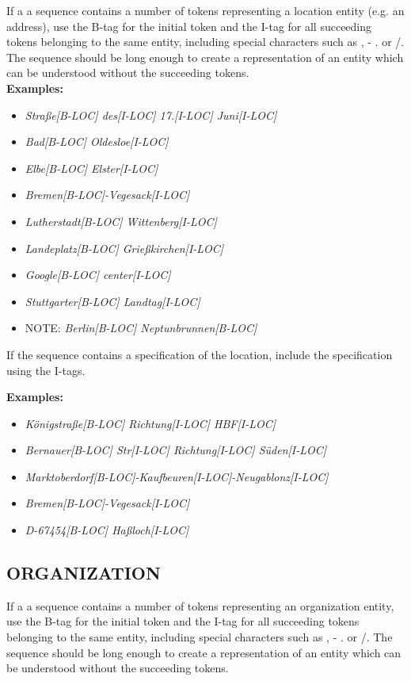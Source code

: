 If a a sequence contains a number of tokens representing a location entity (e.g. an address), use the B-tag for the initial token and the I-tag for all succeeding tokens belonging to the same entity, including special characters such as , - . or /. The sequence should be long enough to create a representation of an entity which can be understood without the succeeding tokens.\\
 
\noindent\textbf{Examples:}
\begin{itemize}
	\item \textit{Straße[B-LOC] des[I-LOC] 17.[I-LOC] Juni[I-LOC]}
	\item \textit{Bad[B-LOC] Oldesloe[I-LOC]}
	\item \textit{Elbe[B-LOC] Elster[I-LOC]}
	\item \textit{Bremen[B-LOC]-Vegesack[I-LOC]}
	\item \textit{Lutherstadt[B-LOC] Wittenberg[I-LOC]}
	\item \textit{Landeplatz[B-LOC] Grießkirchen[I-LOC]}
	\item \textit{Google[B-LOC] center[I-LOC]}
	\item \textit{Stuttgarter[B-LOC] Landtag[I-LOC]}
	\item NOTE: \textit{Berlin[B-LOC] Neptunbrunnen[B-LOC]}
\end{itemize}


\noindent If the sequence contains a specification of the location, include the specification using the I-tags. 

\noindent\textbf{Examples:}
\begin{itemize}
	\item \textit{Königstraße[B-LOC] Richtung[I-LOC] HBF[I-LOC]}
	\item \textit{Bernauer[B-LOC] Str[I-LOC] Richtung[I-LOC] Süden[I-LOC]}
	\item \textit{Marktoberdorf[B-LOC]-Kaufbeuren[I-LOC]-Neugablonz[I-LOC]}
	\item \textit{Bremen[B-LOC]-Vegesack[I-LOC]}
	\item \textit{D-67454[B-LOC] Haßloch[I-LOC]}
\end{itemize}


\subsection*{ORGANIZATION}
If a a sequence contains a number of tokens representing an organization entity, use the B-tag for the initial token and the I-tag for all succeeding tokens belonging to the same entity, including special characters such as , - . or /. The sequence should be long enough to create a representation of an entity which can be understood without the succeeding tokens.\\

